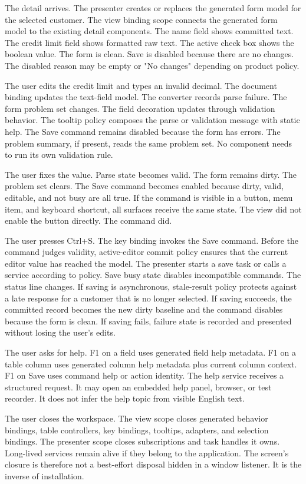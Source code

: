 The detail arrives. The presenter creates or replaces the generated form model
for the selected customer. The view binding scope connects the generated form
model to the existing detail components. The name field shows committed text.
The credit limit field shows formatted raw text. The active check box shows
the boolean value. The form is clean. Save is disabled because there are no
changes. The disabled reason may be empty or "No changes" depending on product
policy.

The user edits the credit limit and types an invalid decimal. The document
binding updates the text-field model. The converter records parse failure.
The form problem set changes. The field decoration updates through validation
behavior. The tooltip policy composes the parse or validation message with
static help. The Save command remains disabled because the form has errors.
The problem summary, if present, reads the same problem set. No component
needs to run its own validation rule.

The user fixes the value. Parse state becomes valid. The form remains dirty.
The problem set clears. The Save command becomes enabled because dirty,
valid, editable, and not busy are all true. If the command is visible in a
button, menu item, and keyboard shortcut, all surfaces receive the same state.
The view did not enable the button directly. The command did.

The user presses Ctrl+S. The key binding invokes the Save command. Before the
command judges validity, active-editor commit policy ensures that the current
editor value has reached the model. The presenter starts a save task or calls
a service according to policy. Save busy state disables incompatible commands.
The status line changes. If saving is asynchronous, stale-result policy
protects against a late response for a customer that is no longer selected.
If saving succeeds, the committed record becomes the new dirty baseline and
the command disables because the form is clean. If saving fails, failure state
is recorded and presented without losing the user's edits.

The user asks for help. F1 on a field uses generated field help metadata. F1
on a table column uses generated column help metadata plus current column
context. F1 on Save uses command help or action identity. The help service
receives a structured request. It may open an embedded help panel, browser, or
test recorder. It does not infer the help topic from visible English text.

The user closes the workspace. The view scope closes generated behavior
bindings, table controllers, key bindings, tooltips, adapters, and selection
bindings. The presenter scope closes subscriptions and task handles it owns.
Long-lived services remain alive if they belong to the application. The
screen's closure is therefore not a best-effort disposal hidden in a window
listener. It is the inverse of installation.

